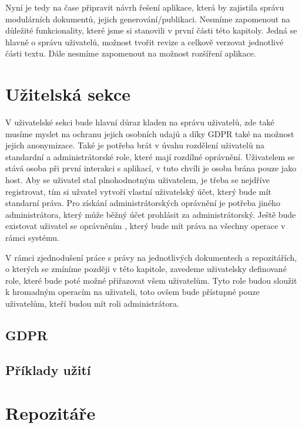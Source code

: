 Nyní je tedy na čase připravit návrh řešení aplikace, která by zajistila správu modulárních dokumentů, jejich generování/publikaci. Nesmíme zapomenout
na důležité funkcionality, které jsme si stanovili v první části této kapitoly. Jedná se hlavně o správu uživatelů, možnost tvořit revize a celkově
verzovat jednotlivé části textu. Dále nesmíme zapomenout na možnost rozšíření aplikace.

\section{Užitelská sekce}

V uživatelské sekci bude hlavní důraz kladen na správu uživatelů, zde také musíme myslet na ochranu jejich osobních udajů a díky GDPR také na
možnost jejich anonymizace. Také je potřeba brát v úvahu rozdělení uživatelů na standardní a administrátorské role, které mají rozdílné oprávnění.
Uživatelem se stává osoba při první interakci s aplikací, v tuto chvíli je osoba brána pouze jako host. Aby se uživatel stal plnohodnotným uživatelem,
je třeba se nejdříve registrovat, tím si užvatel vytvoří vlastní uživatelský účet, který bude mít standarní práva. Pro získání administrátorských
oprávnění je potřeba jiného administrátora, který může běžný účet prohlásit za administrátorský. Ještě bude existovat uživatel se oprávněním
, který bude mít práva na všechny operace v rámci systému.

V rámci zjednodušení práce s právy na jednotlivých dokumentech a repozitářích, o kterých se zmíníme později v této kapitole, zavedeme uživatelsky
definované role, které bude poté možné přiřazovat všem uživatelům. Tyto role budou sloužit k hromadným operacím na uživateli, toto ovšem bude
přístupné pouze uživatelům, kteří budou mít roli administrátora.

\subsection{GDPR}
\subsection{Příklady užití}

\section{Repozitáře}

